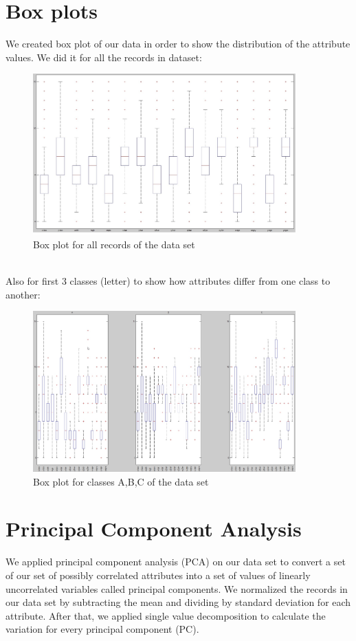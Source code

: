 \section*{Box plots}
We created box plot of our data in order to show the distribution of the
attribute values. We did it for all the records in dataset:
\begin{figure}[!tbh]
	\centering
	\includegraphics[width=0.9\textwidth]{figures/boxplot_all}
	\caption{Box plot for all records of the data set}
	\label{fig:boxplot_all}
\end{figure} \\
Also for first 3 classes (letter) to show how attributes differ from
one class to another: 
\begin{figure}[!tbh]
	\centering
	\includegraphics[width=0.9\textwidth]{figures/boxplot_perclass}
	\caption{Box plot for classes A,B,C of the data set}
	\label{fig:boxplot_perclass}
\end{figure}

\section*{Principal Component Analysis}
We applied principal component analysis (PCA) on our data set to convert
a set of our set of possibly correlated attributes into a set of values of
linearly uncorrelated variables called principal components. We normalized
the records in our data set by subtracting the mean and dividing by standard
deviation for each attribute. After that, we applied single value decomposition
to calculate the variation for every principal component (PC). \\

